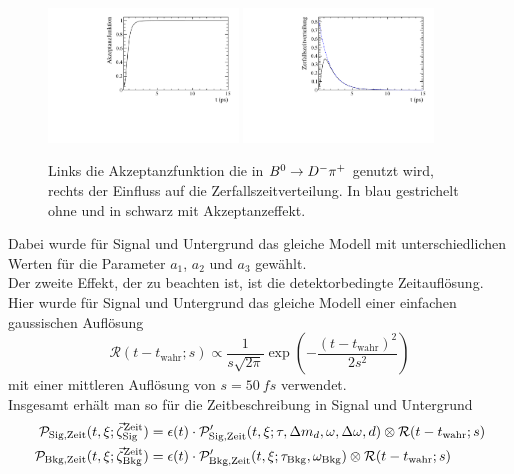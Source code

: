 \begin{figure}[tbp]
	\centering
		\includegraphics[width=0.45\textwidth]{fig/akzeptanz.pdf}
		\includegraphics[width=0.45\textwidth]{fig/akzept_expo.pdf}
	\caption{Links die Akzeptanzfunktion die in ${{B}^0}\rightarrow{\ensuremath{{D}^-}}{\ensuremath{{\pi}^+}}$ genutzt wird, rechts der Einfluss auf die Zerfallszeitverteilung. In blau gestrichelt ohne und in schwarz mit Akzeptanzeffekt.}
	\label{fig:akzeptanz} 
\end{figure}
Dabei wurde für Signal und Untergrund das gleiche Modell mit  unterschiedlichen Werten für die Parameter $a_1$, $a_2$ und $a_3$ gewählt.\\
Der zweite Effekt, der zu beachten ist, ist die detektorbedingte Zeitauflösung. Hier wurde für Signal und Untergrund das gleiche Modell einer einfachen gaussischen Auflösung 
\begin{equation}
\mathcal{R}(t-t_\text{wahr};s)\propto\frac{1}{s\sqrt{2\pi}}\exp\left(-\frac{\left(t-t_\text{wahr}\right)^2}{2s^2}\right)
\end{equation}
mit einer mittleren Auflösung von $s=\SI{50}{fs}$ verwendet.\\
Insgesamt erhält man so für die Zeitbeschreibung in Signal und Untergrund
\begin{equation}
\begin{split}
\mathcal{P}_\text{Sig,Zeit}(t,\xi;\vec{\zeta}_\text{Sig}^\text{Zeit})&=\epsilon(t)\cdot\mathcal{P}'_\text{Sig,Zeit}(t,\xi;\tau,{\Delta m_{{d}}},\omega,\Delta\omega,d)\otimes\mathcal{R}(t-t_\text{wahr};s)\\
\mathcal{P}_\text{Bkg,Zeit}(t,\xi;\vec{\zeta}_\text{Bkg}^\text{Zeit})&=\epsilon(t)\cdot\mathcal{P}'_\text{Bkg,Zeit}(t,\xi;\tau_\text{Bkg},\omega_\text{Bkg})\otimes\mathcal{R}(t-t_\text{wahr};s)
\end{split}
\end{equation}

